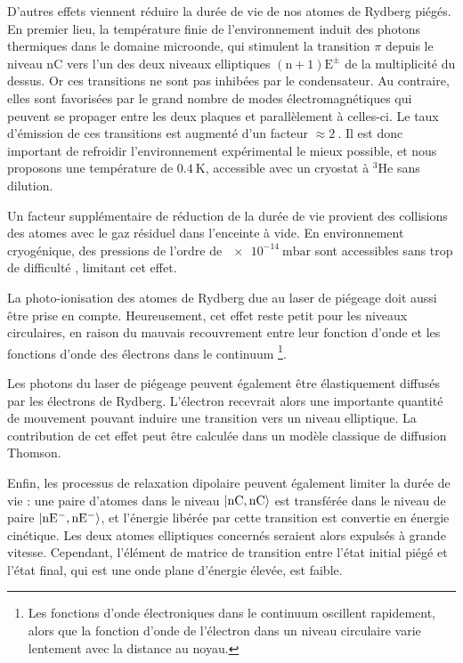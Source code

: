 D'autres effets viennent réduire la durée de vie de nos atomes de Rydberg piégés. %
%
En premier lieu, la température finie de l'environnement induit des photons thermiques dans le domaine microonde, qui stimulent la transition $\pi$ depuis le niveau $\mathrm{nC}$ vers l'un des deux niveaux elliptiques $\mathrm{(n+1)E^\pm}$ de la multiplicité du dessus.
Or ces transitions ne sont pas inhibées par le condensateur.
Au contraire, elles sont favorisées par le grand nombre de modes électromagnétiques qui peuvent se propager entre les deux plaques et parallèlement à celles-ci.
Le taux d'émission de ces transitions est augmenté d'un facteur $\approx \SI{2}{}$.
Il est donc important de refroidir l'environnement expérimental le mieux possible, et nous proposons une température de $\SI{0.4}{\K}$, accessible avec un cryostat à $^3$He sans dilution.

Un facteur supplémentaire de réduction de la durée de vie provient des collisions des atomes avec le gaz résiduel dans l'enceinte à vide.
En environnement cryogénique, des pressions de l'ordre de $\SI{e-14}{\milli\bar}$ sont accessibles sans trop de difficulté \cite{MX_GABRIELSEANTIPROTON90,MX_WERTHCRYOION98}, limitant cet effet.

La photo-ionisation des atomes de Rydberg due au laser de piégeage doit aussi être prise en compte.
Heureusement, cet effet reste petit pour les niveaux circulaires, en raison du mauvais recouvrement entre leur fonction d'onde et les fonctions d'onde des électrons dans le continuum
\footnote{Les fonctions d'onde électroniques dans le continuum oscillent rapidement, alors que la fonction d'onde de l'électron dans un niveau circulaire varie lentement avec la distance au noyau.}.

Les photons du laser de piégeage peuvent également être élastiquement diffusés par les électrons de Rydberg. L'électron recevrait alors une importante quantité de mouvement pouvant induire une transition vers un niveau elliptique.
La contribution de cet effet peut être calculée dans un modèle classique de diffusion Thomson.

Enfin, les processus de relaxation dipolaire peuvent également limiter la durée de vie : une paire d'atomes dans le niveau $\ket{\mathrm{nC,nC}}$ est transférée dans le niveau de paire $\ket{\mathrm{nE^- , nE^-}}$, et l'énergie libérée par cette transition est convertie en énergie cinétique. Les deux atomes elliptiques concernés seraient alors expulsés à grande vitesse.
Cependant, l'élément de matrice de transition entre l'état initial piégé et l'état final, qui est une onde plane d'énergie élevée, est faible.


